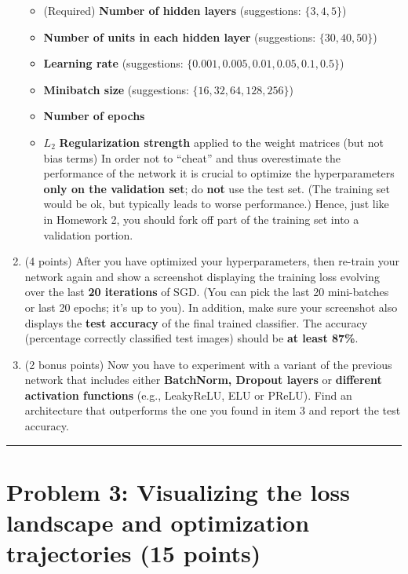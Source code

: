\documentclass[
  letterpaper,
  DIV=11,
  numbers=noendperiod]{scrartcl}
\providecommand{\tightlist}{%
  \setlength{\itemsep}{0pt}\setlength{\parskip}{0pt}}\usepackage{longtable,booktabs,array}
\begin{document}
\begin{enumerate}
  \begin{itemize}
  \tightlist
  \item
    (Required) \textbf{Number of hidden layers} (suggestions:
    \(\{3,4,5\}\))
  \item
    \textbf{Number of units in each hidden layer} (suggestions:
    \(\{30,40,50\}\))
  \item
    \textbf{Learning rate} (suggestions:
    \(\{0.001, 0.005, 0.01, 0.05, 0.1, 0.5\}\))
  \item
    \textbf{Minibatch size} (suggestions: \(\{16,32, 64, 128, 256\}\))
  \item
    \textbf{Number of epochs}
  \item
    \(L_{2}\) \textbf{Regularization strength} applied to the weight
    matrices (but not bias terms) In order not to ``cheat'' and thus
    overestimate the performance of the network it is crucial to
    optimize the hyperparameters \textbf{only on the validation set}; do
    \textbf{not} use the test set. (The training set would be ok, but
    typically leads to worse performance.) Hence, just like in Homework
    2, you should fork off part of the training set into a validation
    portion.
  \end{itemize}
\item
  (4 points) After you have optimized your hyperparameters, then
  re-train your network again and show a screenshot displaying the
  training loss evolving over the last \textbf{20 iterations} of SGD.
  (You can pick the last 20 mini-batches or last 20 epochs; it's up to
  you). In addition, make sure your screenshot also displays the
  \textbf{test accuracy} of the final trained classifier. The accuracy
  (percentage correctly classified test images) should be \textbf{at
  least 87\%}.
\item
  (2 bonus points) Now you have to experiment with a variant of the
  previous network that includes either \textbf{BatchNorm, Dropout
  layers} or \textbf{different activation functions} (e.g., LeakyReLU,
  ELU or PReLU). Find an architecture that outperforms the one you found
  in item 3 and report the test accuracy.
\end{enumerate}

\begin{center}\rule{0.5\linewidth}{0.5pt}\end{center}

\section{Problem 3: Visualizing the loss landscape and optimization
trajectories (15
points)}\label{problem-3-visualizing-the-loss-landscape-and-optimization-trajectories-15-points}
\end{document}

